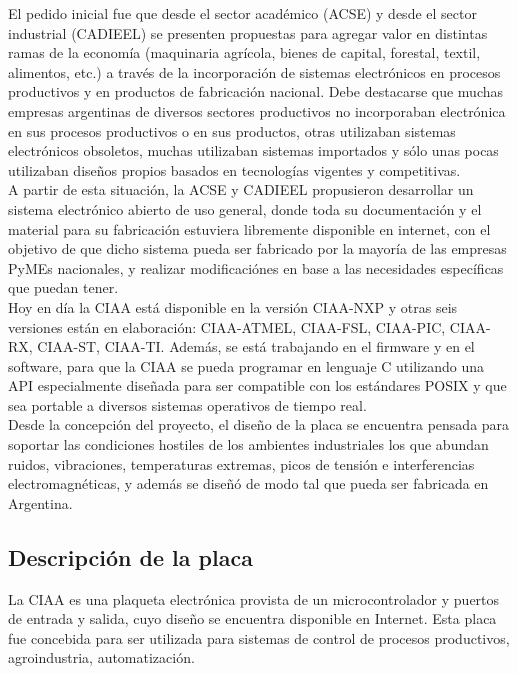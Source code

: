 \documentclass[12pt,letterpaper]{article}
\begin{document}
El pedido inicial fue que desde el sector académico (ACSE) y desde el sector industrial (CADIEEL) se presenten propuestas para agregar valor en distintas ramas de la economía (maquinaria agrícola, bienes de capital, forestal, textil, alimentos, etc.) a través de la incorporación de sistemas electrónicos en procesos productivos y en productos de fabricación nacional. Debe destacarse que muchas empresas argentinas de diversos sectores productivos no incorporaban electrónica en sus procesos productivos o en sus productos, otras utilizaban sistemas electrónicos obsoletos, muchas utilizaban sistemas importados y sólo unas pocas utilizaban diseños propios basados en tecnologías vigentes y competitivas.
  \\

A partir de esta situación, la ACSE y CADIEEL propusieron desarrollar un sistema electrónico abierto de uso general, donde toda su documentación y el material para su fabricación estuviera libremente disponible en internet, con el objetivo de que dicho sistema pueda ser fabricado por la mayoría de las empresas PyMEs nacionales, y realizar modificaciónes en base a las necesidades específicas que puedan tener.
  \\

Hoy en día la CIAA está disponible en la versión CIAA-NXP y otras seis versiones están en elaboración: CIAA-ATMEL, CIAA-FSL, CIAA-PIC, CIAA-RX, CIAA-ST, CIAA-TI. Además, se está trabajando en el firmware y en el software, para que la CIAA se pueda programar en lenguaje C utilizando una API especialmente diseñada para ser compatible con los estándares POSIX y que sea portable a diversos sistemas operativos de tiempo real.
  \\

Desde la concepción del proyecto, el diseño de la placa se encuentra pensada para soportar las condiciones hostiles de los ambientes industriales los que abundan ruidos, vibraciones, temperaturas extremas, picos de tensión e interferencias electromagnéticas, y además se diseñó de modo tal que pueda ser fabricada en Argentina\cite{origeneduciaa}.

\subsection{Descripción de la placa}

La CIAA es una plaqueta electrónica provista de un microcontrolador y puertos de entrada y salida, cuyo diseño se encuentra disponible en Internet. Esta placa fue concebida para ser utilizada para sistemas de control de procesos productivos, agroindustria, automatización.
 \\
 
\end{document}
